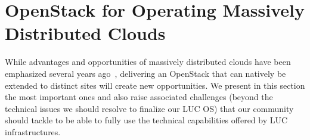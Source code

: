 
\section{OpenStack for Operating Massively Distributed Clouds\label{sec:perspective_work}}

While advantages and opportunities of massively distributed clouds have been emphasized several years ago~\cite{church:2008, greenberg:2008},
delivering an OpenStack that can natively be extended to distinct sites will create new opportunities.
We present in this section the most important ones and also raise associated challenges (beyond the technical issues we should resolve to finalize our
LUC OS) that our community should tackle to be able to fully use the technical capabilities offered by LUC infrastructures.


